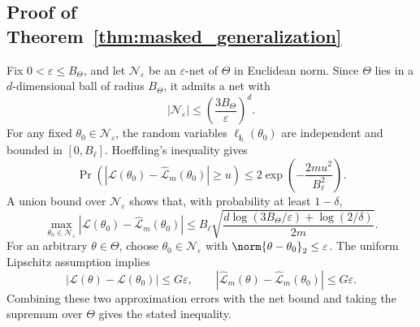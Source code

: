 \subsection{Proof of Theorem~\ref{thm:masked_generalization}}

Fix \(0<\varepsilon\le B_\Theta\), and let
\(\mathcal{N}_\varepsilon\) be an \(\varepsilon\)-net of \(\Theta\) in
Euclidean norm. Since \(\Theta\) lies in a \(d\)-dimensional ball of radius
\(B_\Theta\), it admits a net with
\[
  |\mathcal{N}_\varepsilon|
  \le
  \left(\frac{3B_\Theta}{\varepsilon}\right)^d .
\]
For any fixed \(\theta_0\in\mathcal{N}_\varepsilon\), the random variables
\(\ell_{\mathbf{i}_t}(\theta_0)\) are independent and bounded in
\([0,B_\ell]\). Hoeffding's inequality gives
\[
  \Pr\left(
  \left|
  \mathcal{L}(\theta_0)-\widehat{\mathcal{L}}_m(\theta_0)
  \right|
  \ge u
  \right)
  \le
  2\exp\left(-\frac{2mu^2}{B_\ell^2}\right).
\]
A union bound over \(\mathcal{N}_\varepsilon\) shows that, with probability at
least \(1-\delta\),
\[
  \max_{\theta_0\in\mathcal{N}_\varepsilon}
  \left|
  \mathcal{L}(\theta_0)-\widehat{\mathcal{L}}_m(\theta_0)
  \right|
  \le
  B_\ell
  \sqrt{
  \frac{
  d\log(3B_\Theta/\varepsilon)+\log(2/\delta)}
  {2m}} .
\]
For an arbitrary \(\theta\in\Theta\), choose
\(\theta_0\in\mathcal{N}_\varepsilon\) with
\(\norm{\theta-\theta_0}_2\le\varepsilon\). The uniform Lipschitz assumption
implies
\[
  |\mathcal{L}(\theta)-\mathcal{L}(\theta_0)|\le G\varepsilon,
  \qquad
  |\widehat{\mathcal{L}}_m(\theta)-\widehat{\mathcal{L}}_m(\theta_0)|
  \le G\varepsilon .
\]
Combining these two approximation errors with the net bound and taking the
supremum over \(\Theta\) gives the stated inequality.
